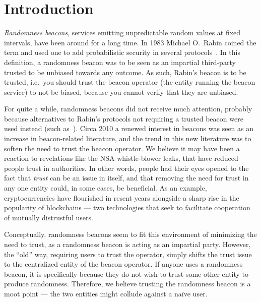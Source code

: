 \section{Introduction}
\emph{Randomness beacons}, services emitting unpredictable random values at fixed intervals, have been around for a long time.
In 1983 Michael O.\ Rabin coined the term and used one to add probabilistic security in several protocols~\cite{rabin1983transaction}.
In this definition, a randomness beacon was to be seen as an impartial third-party trusted to be unbiased towards any outcome.
As such, Rabin's beacon is to be trusted, i.e.\ you should trust the beacon operator (the entity running the beacon service) to not be biased, because you cannot verify that they are unbiased.

For quite a while, randomness beacons did not receive much attention, probably because alternatives to Rabin's protocols not requiring a trusted beacon were used instead (such as~\cite{BGMR}).
Circa 2010 a renewed interest in beacons was seen as an increase in beacon-related literature, and the trend in this new literature was to soften the need to trust the beacon operator.
We believe it may have been a reaction to revelations like the NSA whistle-blower leaks, that have reduced people trust in authorities.
In other words, people had their eyes opened to the fact that \emph{trust} can be an issue in itself, and that removing the need for trust in any one entity could, in some cases, be beneficial.
As an example, cryptocurrencies have flourished in resent years alongside a sharp rise in the popularity of blockchains --- two technologies that seek to facilitate cooperation of mutually distrustful users.

Conceptually, randomness beacons seem to fit this environment of minimizing the need to trust, as a randomness beacon is acting as an impartial party.
However, the \enquote{old} way, requiring users to trust the operator, simply shifts the trust issue to the centralized entity of the beacon operator.
If anyone uses a randomness beacon, it is specifically because they do not wish to trust some other entity to produce randomness.
Therefore, we believe trusting the randomness beacon is a moot point --- the two entities might collude against a naïve user.


